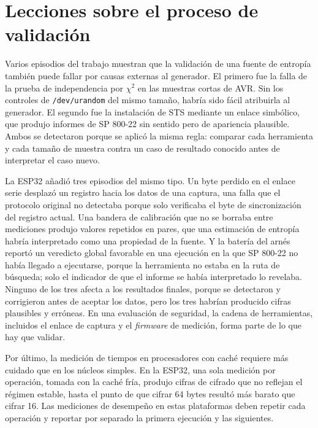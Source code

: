 \section{Lecciones sobre el proceso de validación}

Varios episodios del trabajo muestran que la validación de una fuente de entropía también puede fallar por causas externas al generador. El primero fue la falla de la prueba de independencia por $\chi^2$ en las muestras cortas de AVR. Sin los controles de \texttt{/dev/urandom} del mismo tamaño, habría sido fácil atribuirla al generador. El segundo fue la instalación de STS mediante un enlace simbólico, que produjo informes de SP 800-22 sin sentido pero de apariencia plausible. Ambos se detectaron porque se aplicó la misma regla: comparar cada herramienta y cada tamaño de muestra contra un caso de resultado conocido antes de interpretar el caso nuevo.

La ESP32 añadió tres episodios del mismo tipo. Un byte perdido en el enlace serie desplazó un registro hacia los datos de una captura, una falla que el protocolo original no detectaba porque solo verificaba el byte de sincronización del registro actual. Una bandera de calibración que no se borraba entre mediciones produjo valores repetidos en pares, que una estimación de entropía habría interpretado como una propiedad de la fuente. Y la batería del arnés reportó un veredicto global favorable en una ejecución en la que SP 800-22 no había llegado a ejecutarse, porque la herramienta no estaba en la ruta de búsqueda; solo el indicador de que el informe se había interpretado lo revelaba. Ninguno de los tres afecta a los resultados finales, porque se detectaron y corrigieron antes de aceptar los datos, pero los tres habrían producido cifras plausibles y erróneas. En una evaluación de seguridad, la cadena de herramientas, incluidos el enlace de captura y el \textit{firmware} de medición, forma parte de lo que hay que validar.

Por último, la medición de tiempos en procesadores con caché requiere más cuidado que en los núcleos simples. En la ESP32, una sola medición por operación, tomada con la caché fría, produjo cifras de cifrado que no reflejan el régimen estable, hasta el punto de que cifrar 64 bytes resultó más barato que cifrar 16. Las mediciones de desempeño en estas plataformas deben repetir cada operación y reportar por separado la primera ejecución y las siguientes.
